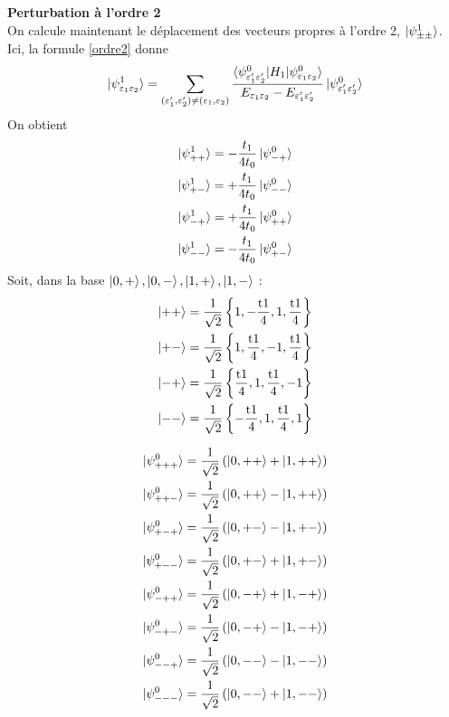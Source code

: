 \documentclass[11pt]{article}
\begin{document}
\textbf{Perturbation à l'ordre 2}\\
On calcule maintenant le déplacement des vecteurs propres à l'ordre 2, $\ket{\psi^1_{\pm \pm}}$.
Ici, la formule \eqref{ordre2} donne
\begin{equation}
	\ket{\psi^1_{\varepsilon_1 \varepsilon_2}} = \sum_{(\varepsilon_1',\varepsilon_2') \neq (\varepsilon_1, \varepsilon_2)} \frac{\braket{\psi^0_{\varepsilon_1' \varepsilon_2'}| H_1 | \psi^0_{\varepsilon_1 \varepsilon_2}}}{E_{\varepsilon_1 \varepsilon_2} - E_{\varepsilon_1'\varepsilon_2'}} \ket{\psi^0_{\varepsilon_1' \varepsilon_2'}}
\end{equation}
On obtient
\begin{align*}
	\ket{\psi^1_{++}} = - \frac{t_1}{4t_0} \ket{\psi^0_{-+}} \\
	\ket{\psi^1_{+-}} = + \frac{t_1}{4t_0} \ket{\psi^0_{--}} \\
	\ket{\psi^1_{-+}} = + \frac{t_1}{4t_0} \ket{\psi^0_{++}} \\
	\ket{\psi^1_{--}} = - \frac{t_1}{4t_0} \ket{\psi^0_{+-}}
\end{align*}
Soit, dans la base $\ket{0,+},\ket{0,-},\ket{1,+},\ket{1,-}$ :
\begin{align}
	\ket{++} = \frac{1}{\sqrt{2}} \left\{1,-\frac{\text{t1}}{4},1,\frac{\text{t1}}{4}\right\} \\
	\ket{+-} = \frac{1}{\sqrt{2}} \left\{1,\frac{\text{t1}}{4},-1,\frac{\text{t1}}{4}\right\} \\
	\ket{-+} = \frac{1}{\sqrt{2}} \left\{\frac{\text{t1}}{4},1,\frac{\text{t1}}{4},-1\right\} \\
	\ket{--} = \frac{1}{\sqrt{2}} \left\{-\frac{\text{t1}}{4},1,\frac{\text{t1}}{4},1\right\}
\end{align}



\begin{align}
	\ket{\psi^0_{+++}} = \frac{1}{\sqrt{2}}\left( \ket{0,++} + \ket{1,++} \right) \\
	\ket{\psi^0_{++-}} = \frac{1}{\sqrt{2}}\left( \ket{0,++} - \ket{1,++} \right) \\
	\ket{\psi^0_{+-+}} = \frac{1}{\sqrt{2}}\left( \ket{0,+-} - \ket{1,+-} \right) \\
	\ket{\psi^0_{+--}} = \frac{1}{\sqrt{2}}\left( \ket{0,+-} + \ket{1,+-} \right) \\
	\ket{\psi^0_{-++}} = \frac{1}{\sqrt{2}}\left( \ket{0,-+} + \ket{1,-+} \right) \\
	\ket{\psi^0_{-+-}} = \frac{1}{\sqrt{2}}\left( \ket{0,-+} - \ket{1,-+} \right) \\
	\ket{\psi^0_{--+}} = \frac{1}{\sqrt{2}}\left( \ket{0,--} - \ket{1,--} \right) \\
	\ket{\psi^0_{---}} = \frac{1}{\sqrt{2}}\left( \ket{0,--} + \ket{1,--} \right)
\end{align}
\end{document}
